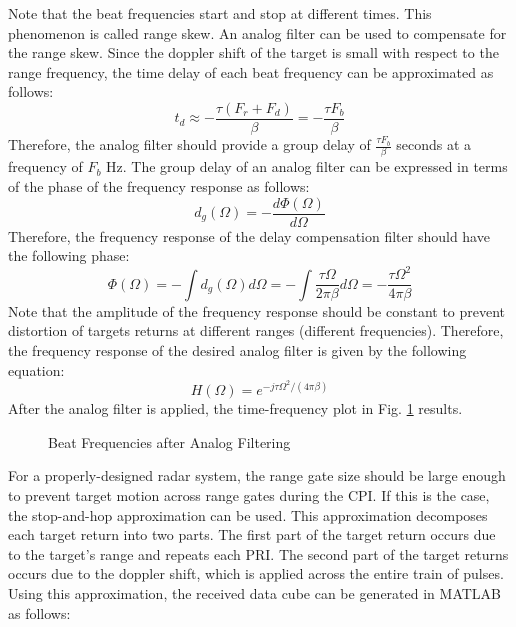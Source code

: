 \documentclass[conference]{IEEEtran}
\begin{document}
Note that the beat frequencies start and stop at different times. This phenomenon is called range skew. An analog filter can be used to compensate for the range skew. Since the doppler shift of the target is small with respect to the range frequency, the time delay of each beat frequency can be approximated as follows:
\begin{equation}
t_d \approx -\frac{\tau(F_r+F_d)}{\beta} = -\frac{\tau F_b}{\beta}
\end{equation}
Therefore, the analog filter should provide a group delay of $\frac{\tau F_b}{\beta}$ seconds at a frequency of $F_b$ Hz. The group delay of an analog filter can be expressed in terms of the phase of the frequency response as follows:
\begin{equation}
d_g(\Omega) = -\frac{d\Phi(\Omega)}{d\Omega}
\end{equation}
Therefore, the frequency response of the delay compensation filter should have the following phase:
\begin{equation}
\Phi(\Omega) = -\int d_g(\Omega)d\Omega = -\int\frac{\tau\Omega}{2\pi\beta}d\Omega = -\frac{\tau\Omega^2}{4\pi\beta}
\end{equation}
Note that the amplitude of the frequency response should be constant to prevent distortion of targets returns at different ranges (different frequencies). Therefore, the frequency response of the desired analog filter is given by the following equation:
\begin{equation}
H(\Omega) = e^{-j\tau\Omega^2/(4\pi\beta)}
\end{equation} 
After the analog filter is applied, the time-frequency plot in Fig. \ref{beat_frequency_analog_filter} results.
\begin{figure}[H]
\centerline{}
\caption{Beat Frequencies after Analog Filtering}
\label{beat_frequency_analog_filter}
\end{figure}
For a properly-designed radar system, the range gate size should be large enough to prevent target motion across range gates during the CPI. If this is the case, the stop-and-hop approximation can be used. This approximation decomposes each target return into two parts. The first part of the target return occurs due to the target's range and repeats each PRI. The second part of the target returns occurs due to the doppler shift, which is applied across the entire train of pulses. Using this approximation, the received data cube can be generated in MATLAB as follows:
\end{document}
